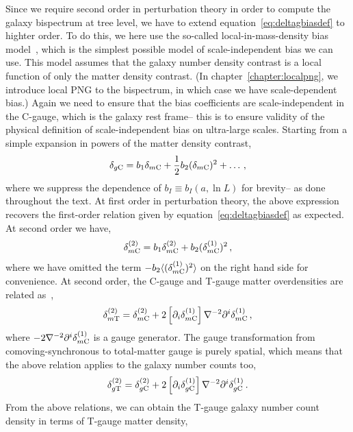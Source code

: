 Since we require second order in perturbation theory in order to compute the galaxy bispectrum at tree level, we have to extend equation~\eqref{eq:deltagbiasdef} to highter order. To do this, we here use the so-called local-in-mass-density bias model~\cite{Desjacques:2016bnm}, which is the simplest possible model of scale-independent bias we can use. This model assumes that the galaxy number density contrast is a local function of only the matter density contrast. (In chapter~\ref{chapter:localpng}, we introduce local PNG to the bispectrum, in which case we have scale-dependent bias.) Again we need to ensure that the bias coefficients are scale-independent in the C-gauge, which is the galaxy rest frame-- this is to ensure validity of the physical definition of scale-independent bias on ultra-large scales. Starting from a simple expansion in powers of the matter density contrast,
\begin{equation}
	\delta_{g\mathrm{C}} = b_1 \delta_{m\mathrm{C}} + \frac{1}{2} b_2 (\delta_{m\mathrm{C}})^2 + \ldots\,,
\end{equation}
where we suppress the dependence of $b_I \equiv b_I(a,\ln L)$ for brevity-- as done throughout the text. At first order in perturbation theory, the above expression recovers the first-order relation given by equation~\eqref{eq:deltagbiasdef} as expected. At second order we have, 
\begin{equation}\label{eq:biasCgauge}
	\delta^{(2)}_{m\mathrm{C}} = b_1 \delta^{(2)}_{m\mathrm{C}} + b_2 (\delta^{(1)}_{m\mathrm{C}})^2\,,
\end{equation}
where we have omitted the term $- b_2 \langle (\delta^{(1)}_{m\mathrm{C}})^2 \rangle$ on the right hand side for convenience.
At second order, the C-gauge and T-gauge matter overdensities are related as~\cite{Bertacca:2015mca,Villa:2015ppa}, 
\begin{equation}
	\delta_{m\mathrm{T}}^{(2)} = \delta_{m\mathrm{C}}^{(2)} + 2 \left[ \partial_i \delta_{m\mathrm{C}}^{(1)} \right] \nabla^{-2} \partial^i \delta_{m\mathrm{C}}^{(1)}\,,
\end{equation}
where $-2\nabla^{-2} \partial^i \delta_{m\mathrm{C}}^{(1)}$ is a gauge generator. The gauge transformation from comoving-synchronous to total-matter gauge is purely spatial, which means that the above relation applies to the galaxy number counts too, 
\begin{equation}
	\delta_{g\mathrm{T}}^{(2)} = \delta_{g\mathrm{C}}^{(2)} + 2 \left[ \partial_i \delta_{g\mathrm{C}}^{(1)} \right] \nabla^{-2} \partial^i \delta_{g\mathrm{C}}^{(1)}\,.
\end{equation}
From the above relations, we can obtain the T-gauge galaxy number count density in terms of T-gauge matter density, 
